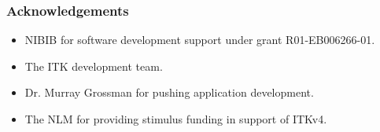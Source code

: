 \documentclass[18pt]{beamer}
\begin{document}
\begin{frame}
\frametitle{Acknowledgements}
\Large
\begin{itemize}
\item NIBIB for software development support under grant R01-EB006266-01.
\item The ITK development team.
\item Dr. Murray Grossman for pushing application development.
\item The NLM for providing stimulus funding in support of ITKv4. 
\end{itemize}
\end{frame}
\end{document}
